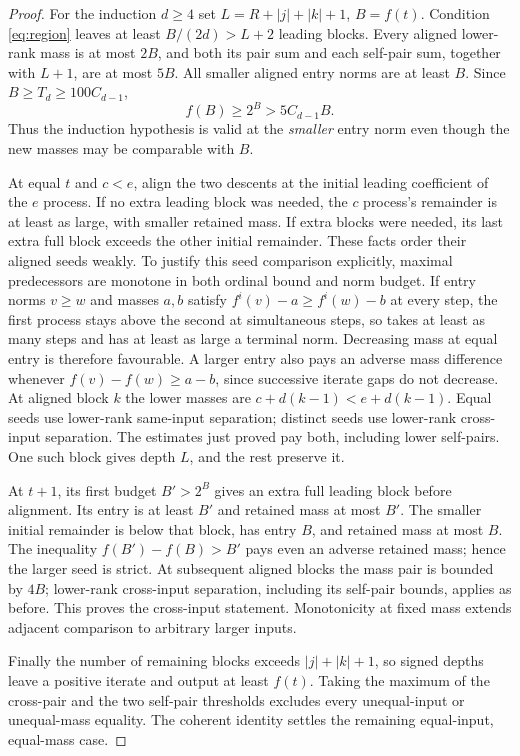 \documentclass[11pt]{article}
\begin{document}
\begin{proof}
For the induction $d\ge4$ set $L=R+|j|+|k|+1$, $B=f(t)$.
Condition \eqref{eq:region} leaves at least $B/(2d)>L+2$ leading
blocks. Every aligned lower-rank mass is at most $2B$, and both its pair
sum and each self-pair sum, together with $L+1$, are at most $5B$.
All smaller aligned entry norms are at least $B$. Since
$B\ge T_d\ge100C_{d-1}$,
\[
 f(B)\ge2^B>5C_{d-1}B.
\]
Thus the induction hypothesis is valid at the \emph{smaller} entry norm
even though the new masses may be comparable with $B$.

At equal $t$ and $c<e$, align the two descents at the initial leading
coefficient of the $e$ process. If no extra leading block was needed,
the $c$ process's remainder is at least as large, with smaller retained
mass. If extra blocks were needed, its last extra full block exceeds the
other initial remainder. These facts order their aligned seeds weakly.
To justify this seed comparison explicitly, maximal predecessors are
monotone in both ordinal bound and norm budget. If entry norms $v\ge w$
and masses $a,b$ satisfy
$f^i(v)-a\ge f^i(w)-b$ at every step, the first process stays above the
second at simultaneous steps, so takes at least as many steps and has at
least as large a terminal norm. Decreasing mass at equal entry is therefore
favourable. A larger entry also pays an adverse mass difference whenever
$f(v)-f(w)\ge a-b$, since successive iterate gaps do not decrease.
At aligned block $k$ the lower masses are $c+d(k-1)<e+d(k-1)$.
Equal seeds use lower-rank same-input separation; distinct seeds use
lower-rank cross-input separation. The estimates just proved pay both,
including lower self-pairs. One such block gives depth $L$, and the rest
preserve it.

At $t+1$, its first budget $B'>2^B$ gives an extra full leading block
before alignment. Its entry is at least $B'$ and retained mass at most
$B'$. The smaller initial remainder is below that block, has entry $B$,
and retained mass at most $B$. The inequality
$f(B')-f(B)>B'$ pays even an adverse retained mass; hence the larger seed
is strict. At subsequent aligned blocks the mass pair is bounded by
$4B$; lower-rank cross-input separation, including its self-pair bounds,
applies as before. This proves the cross-input statement. Monotonicity
at fixed mass extends adjacent comparison to arbitrary larger inputs.

Finally the number of remaining blocks exceeds $|j|+|k|+1$, so signed
depths leave a positive iterate and output at least $f(t)$. Taking the
maximum of the cross-pair and the two self-pair thresholds excludes every
unequal-input or unequal-mass equality. The coherent identity settles the
remaining equal-input, equal-mass case.
\end{proof}
\end{document}
